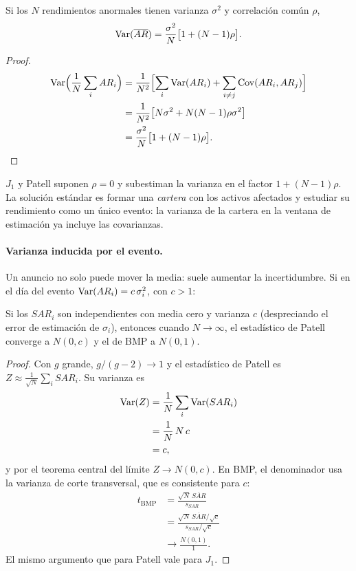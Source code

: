 \begin{proposicion}\label{prop:agrupado}
Si los $N$ rendimientos anormales tienen varianza $\sigma^2$ y correlación común $\rho$,
\[
  \operatorname{Var}(\overline{AR})=\frac{\sigma^2}{N}\bigl[1+(N-1)\rho\bigr].
\]
\end{proposicion}

\begin{proof}
\begin{align*}
  \operatorname{Var}\Bigl(\frac1N\sum_iAR_i\Bigr) &= \frac1{N^2}\Bigl[\sum_i\operatorname{Var}(AR_i)+\sum_{i\neq j}\operatorname{Cov}(AR_i,AR_j)\Bigr]\\
                                    &= \frac1{N^2}\bigl[N\sigma^2+N(N-1)\rho\sigma^2\bigr]\\
                                    &= \frac{\sigma^2}{N}\bigl[1+(N-1)\rho\bigr].
\end{align*}
\end{proof}

$J_1$ y Patell suponen $\rho=0$ y subestiman la varianza en el factor $1+(N-1)\rho$. La solución estándar es formar una
\emph{cartera} con los activos afectados y estudiar su rendimiento como un único evento: la varianza de la cartera en la
ventana de estimación ya incluye las covarianzas.

\paragraph{Varianza inducida por el evento.} Un anuncio no solo puede mover la media: suele aumentar la incertidumbre. Si
en el día del evento $\operatorname{Var}(AR_i)=c\,\sigma_i^2$, con $c>1$:

\begin{proposicion}\label{prop:varinducida}
Si los $SAR_i$ son independientes con media cero y varianza $c$ (despreciando el error de estimación de $\sigma_i$),
entonces cuando $N\to\infty$, el estadístico de Patell converge a $N(0,c)$ y el de BMP a $N(0,1)$.
\end{proposicion}

\begin{proof}
Con $g$ grande, $g/(g-2)\to1$ y el estadístico de Patell es $Z\approx\frac1{\sqrt N}\sum_iSAR_i$. Su varianza es
\begin{align*}
  \operatorname{Var}(Z) &= \frac1N\sum_i\operatorname{Var}(SAR_i)\\
          &= \frac1N\,N\,c\\
          &= c,
\end{align*}
y por el teorema central del límite $Z\to N(0,c)$. En BMP, el denominador usa la varianza de corte transversal, que es
consistente para $c$:
\begin{align*}
  t_{\text{BMP}} &= \frac{\sqrt N\,\overline{SAR}}{s_{SAR}}\\
                &= \frac{\sqrt N\,\overline{SAR}/\sqrt c}{s_{SAR}/\sqrt c}\\
                &\to \frac{N(0,1)}{1}.
\end{align*}
El mismo argumento que para Patell vale para $J_1$.
\end{proof}

